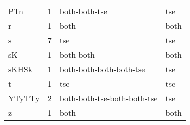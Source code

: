 \documentclass[table,
12pt, %
a4paper, %
oneside, %
headinclude,footinclude, %
BCOR5mm, %
]{scrartcl}
\begin{document}
\begin{table}[htbp]
\begin{adjustbox}{width=\textwidth,center}
\begin{tabular}{|l|c|l|l|}
      PTn        & 1         & both-both-tse                                   & tse             \\
      r          & 1         & both                                            & both            \\
      s          & 7         & tse                                             & tse             \\
      sK         & 1         & both-both                                       & both            \\
      sKHSk      & 1         & both-both-both-both-tse                         & tse             \\
      t          & 1         & tse                                             & tse             \\
      YTyTTy     & 2         & both-both-tse-both-both-tse                     & tse             \\
      z          & 1         & both                                            & both            \\
      \hline
    \end{tabular}
    \label{table:pseudo2}
  \end{adjustbox}
\end{table}
\end{document}
